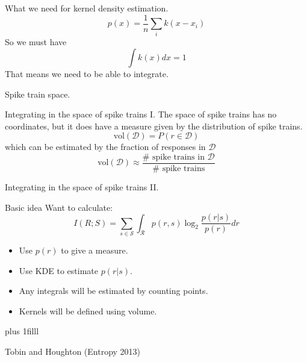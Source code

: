 \documentclass{beamer}
\newcommand{\btVFill}{\vskip0pt plus 1filll}
\begin{document}
\begin{frame}{What we need for kernel density estimation.}
\color{dark}
$$
p(x)=\frac{1}{n}\sum_ik(x-x_i)
$$
\color{black}
So we must have
\color{dark}
$$
\int k(x)dx=1
$$
\color{black}
That means we need to be able to integrate.
\end{frame}


\begin{frame}{Spike train space.}
\color{reddish}
\begin{center}

\end{center}
\color{black}
\end{frame}


\begin{frame}{Integrating in the space of spike trains I.}
The space of spike trains has no coordinates, but it does have a
measure given by the distribution of spike trains.
\color{dark}
$$
\mbox{vol}(\mathcal{D})=P(r\in \mathcal{D})
$$
\color{black}
which can be estimated by the fraction of responses in \color{dark}$\mathcal{D}$
$$
\mbox{vol}(\mathcal{D})\approx\frac{\#\mbox{ spike trains in }\mathcal{D}}{\#\mbox{ spike trains}} 
$$
\color{black}
\end{frame}
 

\begin{frame}{Integrating in the space of spike trains II.}
\color{reddish}
\begin{center}

\end{center}
\color{black}
\end{frame}
 
\begin{frame}{Basic idea}
Want to calculate:
\color{dark}
$$
 I(R;S) =  \sum_{s\in\mathcal{S}}\int_\mathcal{R} p(r,s) \log_2 \frac{p(r|s)}{p(r)} dr  
$$ \color{black}
\begin{itemize}
\item Use \color{dark}$p(r)$\color{black} to give a measure.
\item Use KDE to estimate \color{dark}$p(r|s)$\color{black}. 
\item Any integrals will be estimated by counting points. 
\item Kernels will be defined using volume.
\end{itemize}
\btVFill
\begin{flushright}
\tiny{Tobin and Houghton (Entropy 2013)}
\end{flushright}
\end{frame}
\end{document}
